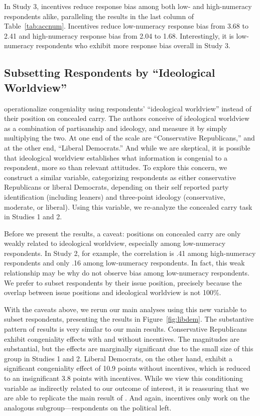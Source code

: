 \documentclass[12pt, letterpaper]{article}
\begin{document}
In Study 3, incentives reduce response bias among both low- and high-numeracy respondents alike, paralleling the results in the last column of Table~\ref{tab:accnum}. Incentives reduce low-numeracy response bias from 3.68 to 2.41 and high-numeracy response bias from 2.04 to 1.68. Interestingly, it is low-numeracy respondents who exhibit more response bias overall in Study 3.

\clearpage
\subsection{Subsetting Respondents by ``Ideological Worldview''}
\label{sec:kahan}
\doublespacing

\citet{kahan2017} operationalize congeniality using respondents' ``ideological worldview'' instead of their position on concealed carry. The authors conceive of ideological worldview as a combination of partisanship and ideology, and measure it by simply multiplying the two. At one end of the scale are ``Conservative Republicans,'' and at the other end, ``Liberal Democrats.'' And while we are skeptical, it is possible that ideological worldview establishes what information is congenial to a respondent, more so than relevant attitudes. To explore this concern, we construct a similar variable, categorizing respondents as either conservative Republicans or liberal Democrats, depending on their self reported party identification (including leaners) and three-point ideology (conservative, moderate, or liberal). Using this variable, we re-analyze the concealed carry task in Studies 1 and 2.  

Before we present the results, a caveat: positions on concealed carry are only weakly related to ideological worldview, especially among low-numeracy respondents. In Study 2, for example, the correlation is .41 among high-numeracy respondents and only .16 among low-numeracy respondents. In fact, this weak relationship may be why \citeauthor{kahan2017} do not observe bias among low-numeracy respondents. We prefer to subset respondents by their issue position, precisely because the overlap between issue positions and ideological worldview is not 100\%.

With the caveats above, we rerun our main analyses using this new variable to subset respondents, presenting the results in Figure~\ref{fig:libdem}. The substantive pattern of results is very similar to our main results. Conservative Republicans exhibit congeniality effects with and without incentives. The magnitudes are substantial, but the effects are marginally significant due to the small size of this group in Studies 1 and 2. Liberal Democrats, on the other hand, exhibit a significant congeniality effect of 10.9 points without incentives, which is reduced to an insignificant 3.8 points with incentives. While we view this conditioning variable as indirectly related to our outcome of interest, it is reassuring that we are able to replicate the main result of \citeauthor{kahan2017}. And again, incentives only work on the analogous subgroup---respondents on the political left.
\end{document}
